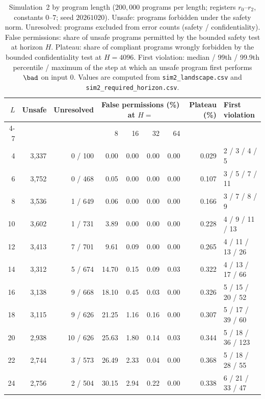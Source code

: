 \begin{table}[htbp]
\centering\small
\caption{Simulation~2 by program length ($200{,}000$ programs per length; registers $r_0$--$r_2$, constants $0$--$7$; seed $20261020$). Unsafe: programs forbidden under the safety norm. Unresolved: programs excluded from error counts (safety / confidentiality). False permissions: share of unsafe programs permitted by the bounded safety test at horizon $H$. Plateau: share of compliant programs wrongly forbidden by the bounded confidentiality test at $H=4096$. First violation: median / 99th / 99.9th percentile / maximum of the step at which an unsafe program first performs $\bad$ on input $0$. Values are computed from \texttt{sim2\_landscape.csv} and \texttt{sim2\_required\_horizon.csv}.}
\label{tab:S1sim2}
\begin{tabular}{rrrrrrrrl}
\toprule
$L$ & Unsafe & Unresolved & \multicolumn{4}{c}{False permissions (\%) at $H=$} & Plateau (\%) & First violation\\
\cmidrule(lr){4-7}
 & & & 8 & 16 & 32 & 64 & & \\
\midrule
4 & 3{,}337 & 0 / 100 & 0.00 & 0.00 & 0.00 & 0.00 & 0.029 & 2 / 3 / 4 / 5\\
6 & 3{,}752 & 0 / 468 & 0.05 & 0.00 & 0.00 & 0.00 & 0.107 & 3 / 5 / 7 / 11\\
8 & 3{,}536 & 1 / 649 & 0.06 & 0.00 & 0.00 & 0.00 & 0.166 & 3 / 7 / 8 / 9\\
10 & 3{,}602 & 1 / 731 & 3.89 & 0.00 & 0.00 & 0.00 & 0.228 & 4 / 9 / 11 / 13\\
12 & 3{,}413 & 7 / 701 & 9.61 & 0.09 & 0.00 & 0.00 & 0.265 & 4 / 11 / 13 / 26\\
14 & 3{,}312 & 5 / 674 & 14.70 & 0.15 & 0.09 & 0.03 & 0.322 & 4 / 13 / 17 / 66\\
16 & 3{,}138 & 9 / 668 & 18.10 & 0.45 & 0.03 & 0.00 & 0.326 & 5 / 15 / 20 / 52\\
18 & 3{,}115 & 9 / 626 & 21.25 & 1.16 & 0.16 & 0.00 & 0.307 & 5 / 17 / 39 / 60\\
20 & 2{,}938 & 10 / 626 & 25.63 & 1.80 & 0.14 & 0.03 & 0.344 & 5 / 18 / 36 / 123\\
22 & 2{,}744 & 3 / 573 & 26.49 & 2.33 & 0.04 & 0.00 & 0.368 & 5 / 18 / 28 / 55\\
24 & 2{,}756 & 2 / 504 & 30.15 & 2.94 & 0.22 & 0.00 & 0.338 & 6 / 21 / 33 / 47\\
\bottomrule
\end{tabular}
\end{table}

